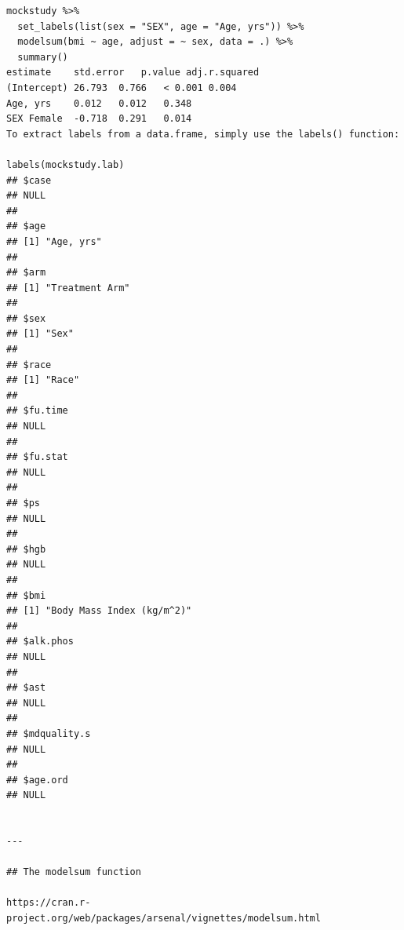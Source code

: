 \documentclass[
]{book}
\begin{document}
\begin{verbatim}
mockstudy %>% 
  set_labels(list(sex = "SEX", age = "Age, yrs")) %>% 
  modelsum(bmi ~ age, adjust = ~ sex, data = .) %>% 
  summary()
estimate    std.error   p.value adj.r.squared
(Intercept) 26.793  0.766   < 0.001 0.004
Age, yrs    0.012   0.012   0.348   
SEX Female  -0.718  0.291   0.014   
To extract labels from a data.frame, simply use the labels() function:

labels(mockstudy.lab)
## $case
## NULL
## 
## $age
## [1] "Age, yrs"
## 
## $arm
## [1] "Treatment Arm"
## 
## $sex
## [1] "Sex"
## 
## $race
## [1] "Race"
## 
## $fu.time
## NULL
## 
## $fu.stat
## NULL
## 
## $ps
## NULL
## 
## $hgb
## NULL
## 
## $bmi
## [1] "Body Mass Index (kg/m^2)"
## 
## $alk.phos
## NULL
## 
## $ast
## NULL
## 
## $mdquality.s
## NULL
## 
## $age.ord
## NULL


---

## The modelsum function

https://cran.r-project.org/web/packages/arsenal/vignettes/modelsum.html


\end{verbatim}
\end{document}
